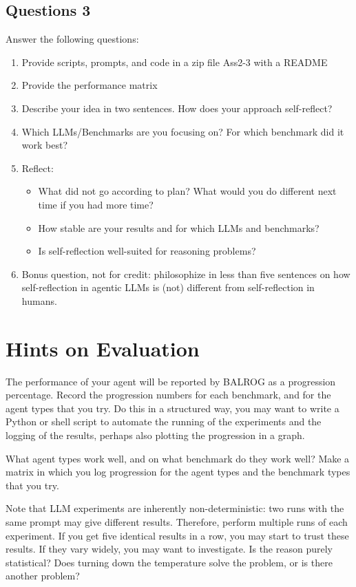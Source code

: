 \documentclass[a4]{article}
\begin{document}
\subsection{Questions 3}
Answer the following questions:
\begin{enumerate}
\item Provide scripts, prompts, and code in a zip file Ass2-3 with a README
\item Provide the performance matrix
\item Describe your idea in two sentences. How does your approach self-reflect?
\item Which LLMs/Benchmarks are you focusing on? For which benchmark did it work best?
\item Reflect: 
\begin{itemize} 
\item What did not go according to plan? What would you do different next time if you had more time?
\item How stable are your results and for which LLMs and benchmarks?
\item Is self-reflection well-suited for reasoning problems? 
\end{itemize}
\item Bonus question, not for credit: philosophize in less than five sentences on how self-reflection in agentic LLMs is (not) different from self-reflection in humans. 
\end{enumerate}

 


\section{Hints on Evaluation}
The performance of your agent will be reported by BALROG as a progression percentage. Record the progression numbers for each benchmark, and for the agent types that you try. Do this in a structured way, you may want to write a Python or shell script to automate the running of the experiments and the logging of the results, perhaps also plotting the progression in a graph.

What agent types work well, and on what benchmark do they work well? Make a matrix in which you log progression for the agent types and the benchmark types that you try.

Note that LLM experiments are inherently non-deterministic: two runs with the same prompt may give different results. Therefore, perform multiple runs of each experiment. If you get five identical results in a row, you may start to trust these results. If they vary widely, you may want to investigate. Is the reason purely statistical? Does turning down the temperature solve the problem, or is there another problem?
\end{document}
